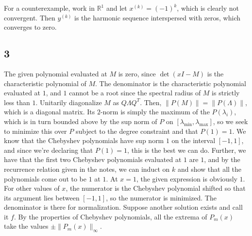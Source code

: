 \documentclass{article}
\newcommand{\rn}{\mathbb{R}}
\begin{document}
For a counterexample, work in $\rn^1$ and let $x^{(k)}=(-1)^k$, which is clearly not convergent. Then $y^{(k)}$ is the harmonic sequence interspersed with zeros, which converges to zero. 
\subsection*{3}
The given polynomial evaluated at $M$ is zero, since $\det(xI-M)$ is the characteristic polynomial of $M$. The denominator is the characteristic polynomial evaluated at $1$, and $1$ cannot be a root since the spectral radius of $M$ is strictly less than $1$.
Unitarily diagonalize $M$ as $Q\Lambda Q^T$. Then, $\|P(M)\|=\|P(\Lambda)\|$, which is a diagonal matrix. Its $2$-norm is simply the maximum of the $P(\lambda_i)$, which is in turn bounded above by the sup norm of $P$ on $[\lambda_\text{min},\lambda_\text{max}]$, so we seek to minimize this over $P$ subject to the degree constraint and that $P(1)=1$. 
We know that the Chebyshev polynomials have sup norm $1$ on the interval $[-1,1]$, and since we're declaring that $P(1)=1$, this is the best we can do. Further, we have that the first two Chebyshev polynomials evaluated at $1$ are $1$, and by the recurrence relation given in the notes, we can induct on $k$ and show that all the polynomials come out to be $1$ at $1$. 
At $x=1$, the given expression is obviously $1$. For other values of $x$, the numerator is the Chebyshev polynomial shifted so that its argument lies between $[-1,1]$, so the numerator is minimized. The denominator is there for normalization.
Suppose another solution exists and call it $f$. By the properties of Chebyshev polynomials, all the extrema of $P_m(x)$ take the values $\pm\|P_m(x)\|_\infty$. 
\end{document}
